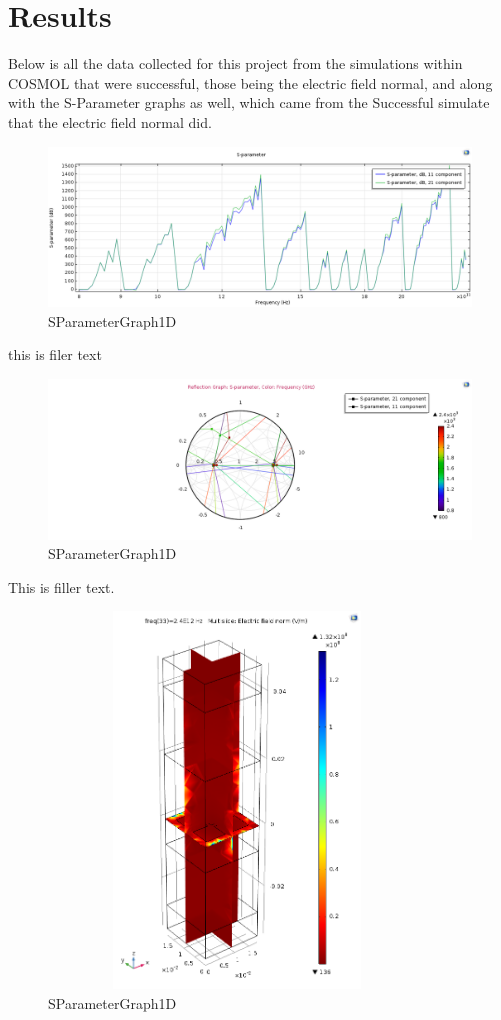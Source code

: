\documentclass[]{article}
\begin{document}
\section*{Results}
Below is all the data collected for this project from the simulations within COSMOL that were successful, those being the electric field normal, and along with the S-Parameter graphs as well, which came from the Successful simulate that the electric field normal did.
\begin{figure}[H]
	\centering
	\includegraphics[width=\textwidth]{SParameterGraph1D.png}
	\caption{SParameterGraph1D}
	\label{test111}
\end{figure}
\noindent
this is filer text
\begin{figure}[H]
	\centering
	\includegraphics[width=\textwidth]{SmithPlotforReflection.png}
	\caption{SParameterGraph1D}
	\label{test1112}
\end{figure}
\noindent
This is filler text.
\begin{figure}[H]
	\centering
	\includegraphics[width=10cm, height=10cm]{ElectricFieldNormalGraphImage2.png}
	\caption{SParameterGraph1D}
	\label{test11122}
\end{figure}
\end{document}
